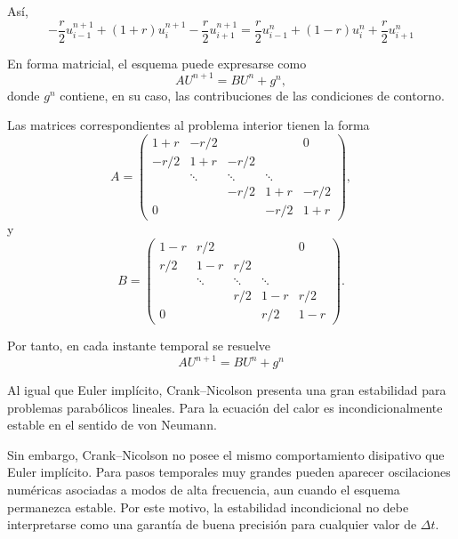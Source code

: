 \documentclass[12pt]{article}
\begin{document}
Así,
\begin{equation}
    \boxed{
    -\frac{r}{2}u_{i-1}^{n+1}
    +
    (1+r)u_i^{n+1}
    -
    \frac{r}{2}u_{i+1}^{n+1}
    =
    \frac{r}{2}u_{i-1}^{n}
    +
    (1-r)u_i^{n}
    +
    \frac{r}{2}u_{i+1}^{n}
    }
\end{equation}

En forma matricial, el esquema puede expresarse como
\begin{equation}
    A U^{n+1}
    =
    B U^n
    +
    g^n,
\end{equation}
donde $g^n$ contiene, en su caso, las contribuciones de las condiciones de contorno.

Las matrices correspondientes al problema interior tienen la forma
\begin{equation}
    A
    =
    \begin{pmatrix}
        1+r & -r/2 &       &       & 0\\
        -r/2 & 1+r & -r/2 &       & \\
             & \ddots & \ddots & \ddots & \\
             &       & -r/2 & 1+r & -r/2\\
        0    &       &       & -r/2 & 1+r
    \end{pmatrix},
\end{equation}
y
\begin{equation}
    B
    =
    \begin{pmatrix}
        1-r & r/2 &       &       & 0\\
        r/2 & 1-r & r/2   &       & \\
            & \ddots & \ddots & \ddots & \\
            &       & r/2 & 1-r & r/2\\
        0   &       &       & r/2 & 1-r
    \end{pmatrix}.
\end{equation}

Por tanto, en cada instante temporal se resuelve
\begin{equation}
    \boxed{
    A U^{n+1}
    =
    B U^n
    +
    g^n
    }
\end{equation}

Al igual que Euler implícito, Crank--Nicolson presenta una gran estabilidad para problemas parabólicos lineales. Para la ecuación del calor es incondicionalmente estable en el sentido de von Neumann.

Sin embargo, Crank--Nicolson no posee el mismo comportamiento disipativo que Euler implícito. Para pasos temporales muy grandes pueden aparecer oscilaciones numéricas asociadas a modos de alta frecuencia, aun cuando el esquema permanezca estable. Por este motivo, la estabilidad incondicional no debe interpretarse como una garantía de buena precisión para cualquier valor de $\Delta t$.
\end{document}
